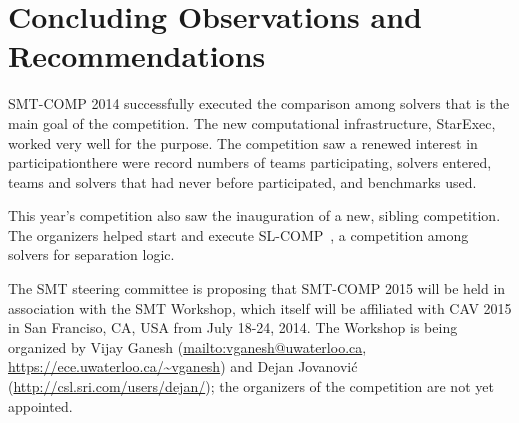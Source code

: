 \documentclass[twoside,11pt]{article}
\begin{document}
\section{Concluding Observations and Recommendations}
\label{sec:conclusions}

SMT-COMP 2014 successfully executed the comparison among solvers that is the main goal
of the competition. The new computational infrastructure, StarExec, worked very well for the purpose. The competition saw a renewed interest in participation\textemdash there were record numbers of teams participating, solvers entered, teams and solvers that had never before participated, and benchmarks used.

This year's competition also saw the inauguration of a new, sibling competition. The organizers helped start and execute SL-COMP~\cite{SLCOMP}, a competition among solvers for separation logic. 

The SMT steering committee is proposing that SMT-COMP 2015 will be held in association with the SMT Workshop, which itself will be affiliated with CAV 2015 in San Franciso, CA, USA from July 18-24, 2014.
The Workshop is being organized by 
Vijay Ganesh (\url{mailto:vganesh@uwaterloo.ca}, \url{https://ece.uwaterloo.ca/~vganesh}) and
Dejan Jovanovi\'c (\url{http://csl.sri.com/users/dejan/}); the organizers of the competition are not yet appointed.
\end{document}
